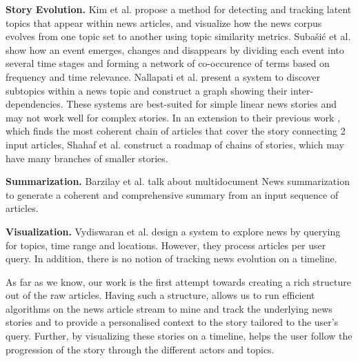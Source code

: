 \textbf{Story Evolution.}  Kim et al.\cite{Kim:2011:TCU:1964750.1964765} propose a method for detecting and tracking latent topics that appear within news articles, and visualize how the news corpus evolves from one topic set to another using topic similarity metrics. Suba\v{s}i\'{c} et al.\cite{subasic-ida:2013} %
 show how an event emerges, changes and disappears by dividing each event into several time stages and forming a network of co-occurence of terms based on frequency and time relevance. Nallapati et al.\cite
{Nallapati:2004:ETW:1031171.1031258, Mei:2005:DET:1081870.1081895} present a system to discover subtopics within a news topic and construct a graph showing their inter-dependencies. These systems are best-suited for simple linear news stories and may not work well for complex stories. In an extension to their previous work \cite{shahaf@kdd2010}, which finds the most coherent chain of articles that cover the story connecting 2 input articles, Shahaf et al.\cite{shahaf@www2012} construct a roadmap of chains of stories, which may have many branches of smaller stories. 

\textbf{Summarization.} Barzilay et al.\cite{Barzilay:2002:ISS:1622810.1622812} talk about multidocument News summarization to generate a coherent and comprehensive summary from an input sequence of articles.

\textbf{Visualization.} Vydiswaran et al.\cite{MEET:MEET14504801078} design a system to explore news by querying for topics, time range and locations. However, they process articles per user query. In addition, there is no notion of tracking news evolution on a timeline.

As far as we know, our work is the first attempt towards creating a rich structure out of the raw articles. Having such a structure, allows us to run efficient algorithms on the news article stream to mine and track the underlying news stories and to provide a personalised context to the story tailored to the user's query. Further, by visualizing these stories on a timeline, helps the user follow the progression of the story through the different actors and topics.
